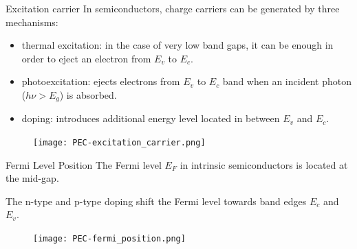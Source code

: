 \documentclass[10pt,compress,handout]{beamer}
\begin{document}
    \begin{frame}{Excitation carrier}
        In semiconductors, charge carriers can be generated by three mechanisms: 
        \begin{itemize}
            \item thermal excitation: in the case of very low band gaps, it can be enough in order 
            to eject an electron from $E_v$ to $E_c$.
            \item photoexcitation: ejects electrons from $E_v$ to $E_c$
            band when an incident photon ($h\nu > E_g$) is absorbed.
            \item doping: introduces additional energy level located in between $E_v$ and $E_c$.
        \end{itemize}
        
        \begin{figure}[h]
            \centering
            \texttt{[image: PEC-excitation\_carrier.png]}
            \label{fig_excitation_carrier}
        \end{figure}
    \end{frame}

    \begin{frame}{Fermi Level Position}
        The Fermi level $E_F$ in intrinsic semiconductors is located at the mid-gap. 
        
        The n-type and p-type doping shift the Fermi level towards band edges 
        $E_c$ and $E_v$.
        
        \begin{figure}[H]
            \centering
            \texttt{[image: PEC-fermi\_position.png]}
            \label{fig_fermi_position}
        \end{figure}
    \end{frame}
\end{document}
